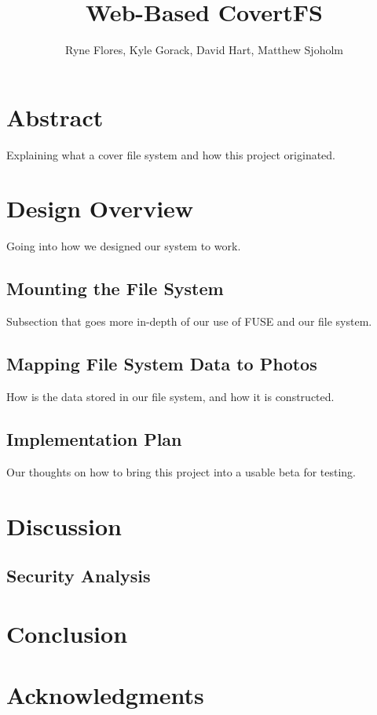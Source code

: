\documentclass{proc}
\title{Web-Based CovertFS}
\author{Ryne Flores, Kyle Gorack, David Hart, Matthew Sjoholm}
\date{}
\begin{document}
\maketitle

\section{Abstract}

Explaining what a cover file system and how this project originated.

\section{Design Overview}

Going into how we designed our system to work.

\subsection{Mounting the File System}

Subsection that goes more in-depth of our use of FUSE and our file system.

\subsection{Mapping File System Data to Photos}

How is the data stored in our file system, and how it is constructed.

\subsection{Implementation Plan}

Our thoughts on how to bring this project into a usable beta for testing.

\section{Discussion}

\subsection{Security Analysis}

\section{Conclusion}

\section{Acknowledgments}
\end{document}
